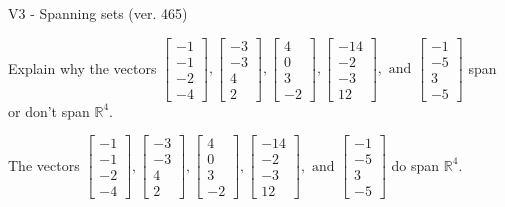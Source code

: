 \begin{exercise}
  \begin{exerciseTitle}V3 - Spanning sets (ver. 465)\end{exerciseTitle}
  \begin{exerciseStatement}
    Explain why the vectors \(\left[\begin{array}{r}
-1 \\
-1 \\
-2 \\
-4
\end{array}\right] , \left[\begin{array}{r}
-3 \\
-3 \\
4 \\
2
\end{array}\right] , \left[\begin{array}{r}
4 \\
0 \\
3 \\
-2
\end{array}\right] , \left[\begin{array}{r}
-14 \\
-2 \\
-3 \\
12
\end{array}\right] , \text{ and } \left[\begin{array}{r}
-1 \\
-5 \\
3 \\
-5
\end{array}\right]\) span or don't span \(\mathbb{R}^4\). 
	


  \end{exerciseStatement}
  \begin{exerciseAnswer}
   The vectors \(\left[\begin{array}{r}
-1 \\
-1 \\
-2 \\
-4
\end{array}\right] , \left[\begin{array}{r}
-3 \\
-3 \\
4 \\
2
\end{array}\right] , \left[\begin{array}{r}
4 \\
0 \\
3 \\
-2
\end{array}\right] , \left[\begin{array}{r}
-14 \\
-2 \\
-3 \\
12
\end{array}\right] , \text{ and } \left[\begin{array}{r}
-1 \\
-5 \\
3 \\
-5
\end{array}\right]\) 
  	 do  
	span \(\mathbb{R}^4\).
  



\end{exerciseAnswer}
\end{exercise}
